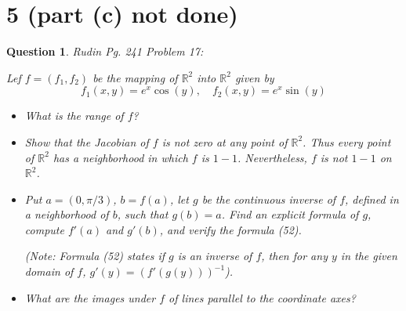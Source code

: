 \documentclass{article}
\newtheorem{question}{Question}
\begin{document}
\section*{5 (part (c) not done)}
\begin{myBox}[]{}
    \begin{question}
        Rudin Pg. 241 Problem 17:

        Lef $f=(f_1,f_2)$ be the mapping of $\mathbb{R}^2$ into $\mathbb{R}^2$ given by 
        $$f_1(x,y)=e^x\cos(y),\quad f_2(x,y)=e^x\sin(y)$$
        \begin{itemize}
            \item[(a)] What is the range of $f$?
            \item[(b)] Show that the Jacobian of $f$ is not zero at any point of $\mathbb{R}^2$. Thus every point of $\mathbb{R}^2$
            has a neighborhood in which $f$ is $1-1$. Nevertheless, $f$ is not $1-1$ on $\mathbb{R}^2$.
            \item[(c)] Put $a=(0,\pi/3)$, $b=f(a)$, let $g$ be the continuous inverse of $f$, defined in a neighborhood of $b$, such that $g(b)=a$.
            Find an explicit formula of $g$, compute $f'(a)$ and $g'(b)$, and verify the formula (52).

            (Note: Formula (52) states if $g$ is an inverse of $f$, then for any $y$ in the given domain of $f$, $g'(y)=(f'(g(y)))^{-1}$).
            \item[(d)] What are the images under $f$ of lines parallel to the coordinate axes?
        \end{itemize}
    \end{question}
\end{myBox}
\end{document}
